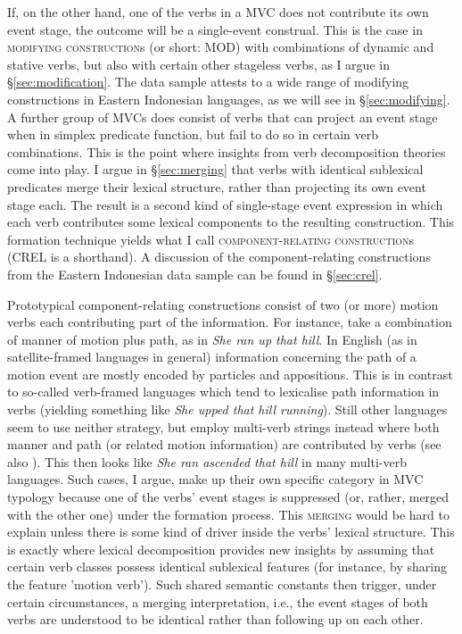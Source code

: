 If, on the other hand, one of the verbs in a MVC does not contribute its own event stage, the outcome will be a single-event construal. This is the case in \textsc{modifying construction}s (or short: MOD) with combinations of dynamic and stative verbs, but also with certain other stageless verbs, as I argue in §\ref{sec:modification}. The data sample attests to a wide range of modifying constructions in Eastern Indonesian languages, as we will see in §\ref{sec:modifying}. A further group of MVCs does consist of verbs that can project an event stage when in simplex predicate function, but fail to do so in certain verb combinations. This is the point where insights from verb decomposition theories come into play. I argue in §\ref{sec:merging} that verbs with identical sublexical predicates merge their lexical structure, rather than projecting its own event stage each. The result is a second kind of single-stage event expression in which each verb contributes some lexical components to the resulting construction. This formation technique yields what I call \textsc{component-relating construction}s (CREL is a shorthand). A discussion of the component-relating constructions from the Eastern Indonesian data sample can be found in §\ref{sec:crel}.

Prototypical component-relating constructions consist of two (or more) motion verbs each contributing part of the information. For instance, take a combination of manner of motion plus path, as in \textit{She ran up that hill}. In English (as in satellite-framed languages in general) information concerning the path of a motion event are mostly encoded by particles and appositions. This is in contrast to so-called verb-framed languages which tend to lexicalise path information in verbs (yielding something like \textit{She upped that hill running}). Still other languages seem to use neither strategy, but employ multi-verb strings instead where both manner and path (or related motion information) are contributed by verbs (see also \citealt{Ameka2013}). This then looks like \textit{She ran ascended that hill} in many multi-verb languages. Such cases, I argue, make up their own specific category in MVC typology because one of the verbs' event stages is suppressed (or, rather, merged with the other one) under the formation process. This \textsc{merging} would be hard to explain unless there is some kind of driver inside the verbs' lexical structure. This is exactly where lexical decomposition provides new insights by assuming that certain verb classes possess identical sublexical features (for instance, by sharing the feature 'motion verb'). Such shared semantic constants then trigger, under certain circumstances, a merging interpretation, i.e., the event stages of both verbs are understood to be identical rather than following up on each other.

